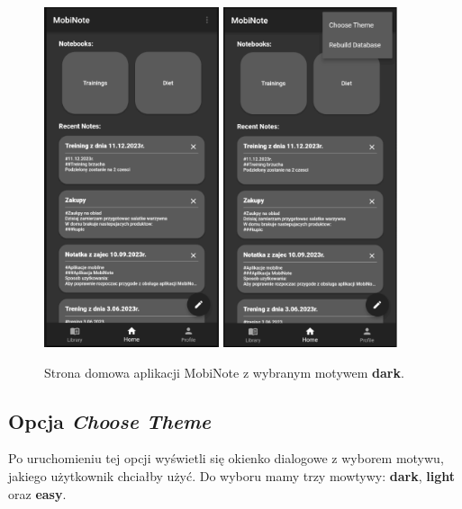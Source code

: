 \documentclass[shortabstract]{iithesis}
\begin{document}
\begin{figure}[h]
    \centering
    \includegraphics[height=10cm]{images/strona_domowa.png}
    \quad\quad
    \includegraphics[height=10cm]{images/strona_domowa_opcje.png}
    \caption{Strona domowa aplikacji MobiNote z wybranym motywem \textbf{dark}.}
\end{figure}

\subsection{Opcja \textit{Choose Theme}}

Po uruchomieniu tej opcji wyświetli się okienko dialogowe z wyborem motywu, jakiego użytkownik chciałby użyć. Do wyboru mamy trzy mowtywy: \textbf{dark}, \textbf{light} oraz \textbf{easy}.
\end{document}
